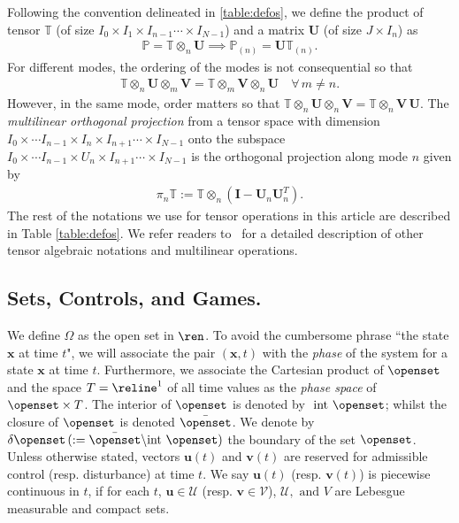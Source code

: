 Following the convention delineated in \autoref{table:defos}, we define the product of tensor $\mathds{T}$ (of size $I_0 \times I_1 \times I_{n-1} \cdots \times I_{N-1}$) and a matrix $\mathbf{U}$ (of size $J \times I_n$) as
%
\begin{align}
	\mathds{P} = \mathds{T} \otimes_n \mathbf{U} \implies \mathds{P}_{(n)} = \mathbf{U}  \mathds{T}_{(n)}.
	\label{eq:ttm}
\end{align}
%
For different modes, the ordering of the modes is not consequential so that 
%
\begin{align}
	\mathds{T} \otimes_n \mathbf{U} \otimes_m \mathbf{V} = \mathds{T} \otimes_m \mathbf{V} \otimes_n \mathbf{U} \quad \forall \, m \neq n.
\end{align}
%
However, in the same mode, order matters so that $\mathds{T} \otimes_n \mathbf{U} \otimes_n \mathbf{V} = \mathds{T} \otimes_n \mathbf{V} \, \mathbf{U}$. The \textit{multilinear orthogonal projection} from a tensor space with dimension ${I_0 \times \cdots I_{n-1}  \times I_n \times I_{n+1} \cdots \times I_{N-1}}$ onto the subspace ${I_0 \times \cdots I_{n-1}  \times U_n \times I_{n+1} \cdots \times I_{N-1}}$ is the orthogonal projection along mode $n$ given by
%
\begin{align}
	\pi_n \mathds{T} := \mathds{T}\otimes_n \left(\mathbf{I}-\mathbf{U}_n \mathbf{U}_n^T \right).
\end{align}
%
The rest of the notations we use for tensor operations in this article are described in Table \ref{table:defos}. We refer readers to~\cite{Kolda2009, VannieuwenhovenTruncate2012} for a detailed description of other tensor algebraic notations and multilinear operations. 

\subsection{Sets, Controls, and Games.}
%
\noindent We define $\Omega$ as the open set in $\ren$. To avoid the cumbersome phrase ``the state $\bm{x}$ at time $t$", we will associate the pair $(\bm{x}, t)$ with the \textit{phase} of the system for a state $\bm{x}$ at time $t$. Furthermore, we associate the Cartesian product of $\openset$ and the space $T =\reline^1$ of all time values as the \textit{phase space} of $\openset \times T$. The interior of $\openset$ is denoted by $\text{ int } \openset$; whilst the closure of $\openset$ is denoted $\bar{\openset}$. We denote by $\delta \openset \,(:= \bar{\openset} \backslash \text{int } \openset)$ the boundary of the set $\openset$. Unless otherwise stated, vectors $\bm{u}(t)$ and $\bm{v}(t)$ are reserved for admissible control (resp. disturbance) at time $t$. We say $\bm{u}(t)$ (resp. $\bm{v}(t)$) is piecewise continuous in $t$, if for each $t$, $\bm{u} \in \mathcal{U}$ (resp. $\bm{v} \in \mathcal{V}$), $\mathcal{U}, \text{ and } {V}$ are Lebesgue measurable and compact sets. 

